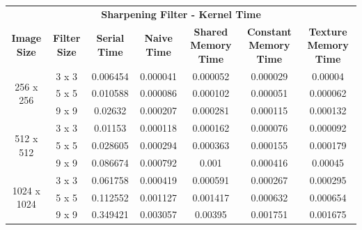 \documentclass[10pt]{article}
\begin{document}
\begin{table}[H]
\small
\begin{tabular}{ccccccc}
\multicolumn{7}{c}{\textbf{Sharpening Filter - Kernel Time}}                                                                                                                                                \\
\textbf{Image Size}          & \textbf{Filter Size} & \textbf{Serial Time} & \textbf{Naive Time} & \textbf{Shared Memory Time} & \textbf{Constant Memory Time} & \textbf{Texture Memory Time} \\ \hline
\multirow{3}{*}{256 x 256}   & 3 x 3                & 0.006454             & 0.000041            & 0.000052                    & 0.000029                      & 0.00004                      \\
                             & 5 x 5                & 0.010588             & 0.000086            & 0.000102                    & 0.000051                      & 0.000062                     \\
                             & 9 x 9                & 0.02632              & 0.000207            & 0.000281                    & 0.000115                      & 0.000132                     \\ \hline
\multirow{3}{*}{512 x 512}   & 3 x 3                & 0.01153              & 0.000118            & 0.000162                    & 0.000076                      & 0.000092                     \\
                             & 5 x 5                & 0.028605             & 0.000294            & 0.000363                    & 0.000155                      & 0.000179                     \\
                             & 9 x 9                & 0.086674             & 0.000792            & 0.001                       & 0.000416                      & 0.00045                      \\ \hline
\multirow{3}{*}{1024 x 1024} & 3 x 3                & 0.061758             & 0.000419            & 0.000591                    & 0.000267                      & 0.000295                     \\
                             & 5 x 5                & 0.112552             & 0.001127            & 0.001417                    & 0.000632                      & 0.000654                     \\
                             & 9 x 9                & 0.349421             & 0.003057            & 0.00395                     & 0.001751                      & 0.001675                     \\ \hline

\end{tabular}
\end{table}
\end{document}
